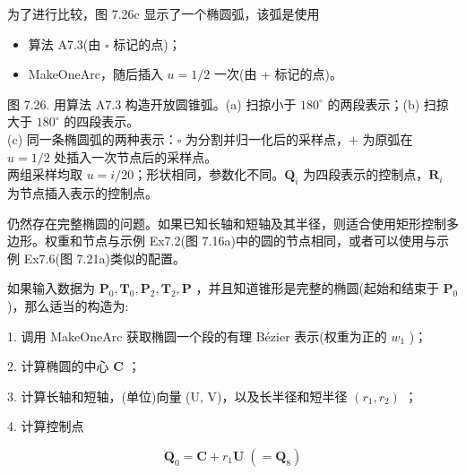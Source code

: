 \documentclass[../main.tex]{subfiles}
\begin{document}
为了进行比较，图 7.26c 显示了一个椭圆弧，该弧是使用

\begin{itemize}
\item 算法 A7.3(由 \(\square\) 标记的点)；
\end{itemize}

\begin{itemize}
\item MakeOneArc，随后插入 \(u = 1/2\) 一次(由 + 标记的点)。
\end{itemize}

\begin{center}
\begin{minipage}{34cm}
\vspace*{.6\baselineskip}
\centering
{}
\par\vspace{.5cm}
\par\smallskip
图 7.26. 用算法 A7.3 构造开放圆锥弧。(a) 扫掠小于 $180^\circ$ 的两段表示；(b) 扫掠大于 $180^\circ$ 的四段表示。\\
(c) 同一条椭圆弧的两种表示：$\square$ 为分割并归一化后的采样点，$+$ 为原弧在 $u=1/2$ 处插入一次节点后的采样点。\\
两组采样均取 $u=i/20$；形状相同，参数化不同。$\mathbf Q_i$ 为四段表示的控制点，$\mathbf R_i$ 为节点插入表示的控制点。
\end{minipage}
\end{center}

仍然存在完整椭圆的问题。如果已知长轴和短轴及其半径，则适合使用矩形控制多边形。权重和节点与示例 Ex7.2(图 7.16a)中的圆的节点相同，或者可以使用与示例 Ex7.6(图 7.21a)类似的配置。

如果输入数据为 \({\mathbf{P}}_{0},{\mathbf{T}}_{0},{\mathbf{P}}_{2},{\mathbf{T}}_{2},\mathbf{P}\) ，并且知道锥形是完整的椭圆(起始和结束于 \({\mathbf{P}}_{0}\) )，那么适当的构造为:

1. 调用 MakeOneArc 获取椭圆一个段的有理 Bézier 表示(权重为正的 \({w}_{1}\) )；



2. 计算椭圆的中心 \(\mathbf{C}\) ；

3. 计算长轴和短轴，(单位)向量 (U, V)，以及长半径和短半径 \(\left( {{r}_{1},{r}_{2}}\right)\) ；

4. 计算控制点

\[
{\mathbf{Q}}_{0} = \mathbf{C} + {r}_{1}\mathbf{U}\;\left( { = {\mathbf{Q}}_{8}}\right)
\]
\end{document}

